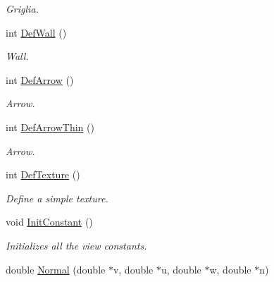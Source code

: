 \begin{DoxyCompactItemize}
\begin{DoxyCompactList}\small\item\em Griglia. \end{DoxyCompactList}\item 
int \hyperlink{classDraw_a9e8807139062d3d8e7a5ae14e98480da}{Def\+Wall} ()\hypertarget{classDraw_a9e8807139062d3d8e7a5ae14e98480da}{}\label{classDraw_a9e8807139062d3d8e7a5ae14e98480da}

\begin{DoxyCompactList}\small\item\em Wall. \end{DoxyCompactList}\item 
int \hyperlink{classDraw_aa63c0ecef2860e57c23d6ff1e631189b}{Def\+Arrow} ()\hypertarget{classDraw_aa63c0ecef2860e57c23d6ff1e631189b}{}\label{classDraw_aa63c0ecef2860e57c23d6ff1e631189b}

\begin{DoxyCompactList}\small\item\em Arrow. \end{DoxyCompactList}\item 
int \hyperlink{classDraw_a19a76422b4564ec10df73ec0256f2974}{Def\+Arrow\+Thin} ()\hypertarget{classDraw_a19a76422b4564ec10df73ec0256f2974}{}\label{classDraw_a19a76422b4564ec10df73ec0256f2974}

\begin{DoxyCompactList}\small\item\em Arrow. \end{DoxyCompactList}\item 
int \hyperlink{classDraw_a5fd96ad8c1ebeede7341bcf3a20aa65d}{Def\+Texture} ()\hypertarget{classDraw_a5fd96ad8c1ebeede7341bcf3a20aa65d}{}\label{classDraw_a5fd96ad8c1ebeede7341bcf3a20aa65d}

\begin{DoxyCompactList}\small\item\em Define a simple texture. \end{DoxyCompactList}\item 
void \hyperlink{classDraw_ac0790850f6751e5fe0f47d16d7f67255}{Init\+Constant} ()\hypertarget{classDraw_ac0790850f6751e5fe0f47d16d7f67255}{}\label{classDraw_ac0790850f6751e5fe0f47d16d7f67255}

\begin{DoxyCompactList}\small\item\em Initializes all the view constants. \end{DoxyCompactList}\item 
double \hyperlink{classDraw_a16f350a8340f724d1b358e89fe18c340}{Normal} (double $\ast$v, double $\ast$u, double $\ast$w, double $\ast$n)\hypertarget{classDraw_a16f350a8340f724d1b358e89fe18c340}{}\label{classDraw_a16f350a8340f724d1b358e89fe18c340}


\end{DoxyCompactItemize}
